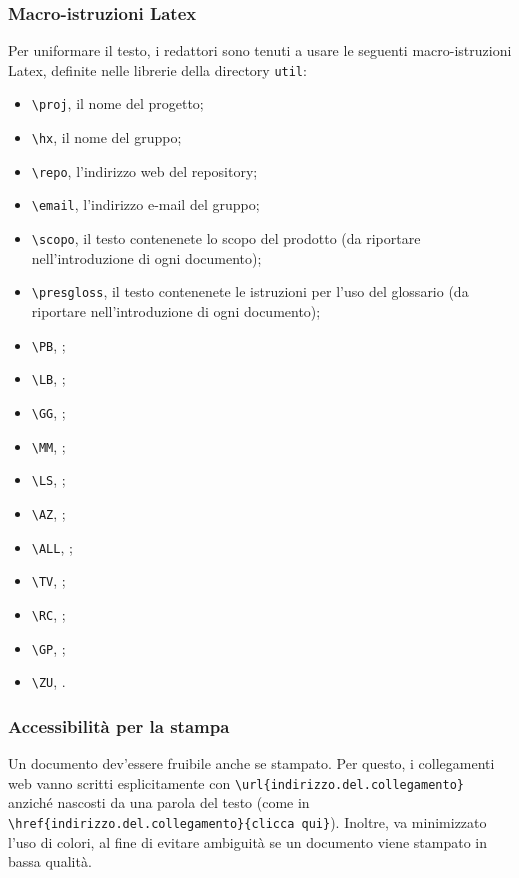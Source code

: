 \subsubsection{Macro-istruzioni Latex}
Per uniformare il testo, i redattori sono tenuti a usare le seguenti macro-istruzioni Latex, definite nelle librerie della directory \texttt{util}:
\begin{itemize}
	\item \texttt{\textbackslash proj}, il nome del progetto;
	\item \texttt{\textbackslash hx}, il nome del gruppo;
	\item \texttt{\textbackslash repo}, l'indirizzo web del repository;
	\item \texttt{\textbackslash email}, l'indirizzo e-mail del gruppo;
	\item \texttt{\textbackslash scopo}, il testo contenenete lo scopo del prodotto (da riportare nell'introduzione di ogni documento);
	\item \texttt{\textbackslash presgloss}, il testo contenenete le istruzioni per l'uso del glossario (da riportare nell'introduzione di ogni documento);
	\item \texttt{\textbackslash PB}, \PB;
	\item \texttt{\textbackslash LB}, \LB;
	\item \texttt{\textbackslash GG}, \GG;
	\item \texttt{\textbackslash MM}, \MM;
	\item \texttt{\textbackslash LS}, \LS;
	\item \texttt{\textbackslash AZ}, \AZ;
	\item \texttt{\textbackslash ALL}, \ALL;
	\item \texttt{\textbackslash TV}, \TV;
	\item \texttt{\textbackslash RC}, \RC;
	\item \texttt{\textbackslash GP}, \GP;
	\item \texttt{\textbackslash ZU}, \ZU.
\end{itemize}

\subsubsection{Accessibilità per la stampa} Un documento dev'essere fruibile anche se stampato. Per questo, i collegamenti web vanno scritti esplicitamente con \texttt{\textbackslash url\{indirizzo.del.collegamento\}} anziché nascosti da una parola del testo (come in \texttt{\textbackslash href\{indirizzo.del.collegamento\}\{clicca qui\}}). Inoltre, va minimizzato l'uso di colori, al fine di evitare ambiguità se un documento viene stampato in bassa qualità.



